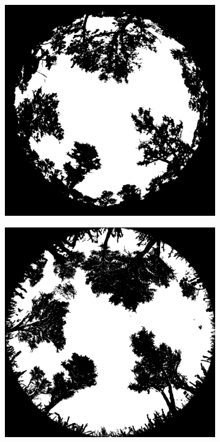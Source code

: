 \documentclass[11pt,a4paper]{article}
\begin{document}
\begin{figure}
	\begin{subfigure}{0.45\linewidth}
		\includegraphics[width=\linewidth]{hemi_hemi}
		\caption{}
		\label{hemi_hemi}
	\end{subfigure}
	\hfill
	\begin{subfigure}{0.45\linewidth}
		\includegraphics[width=\linewidth]{hemi_tls}

\end{subfigure}
\end{figure}
\end{document}
